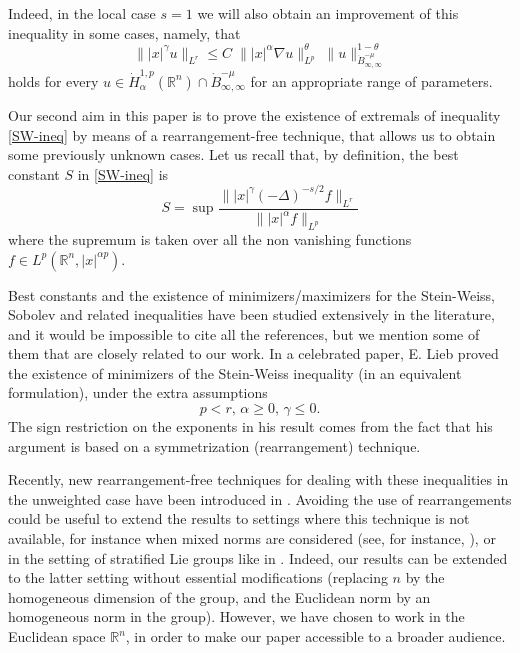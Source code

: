 \documentclass[12pt]{amsart}
\newcommand {\R}{\mathbb{R}}
\newcommand {\be}{\begin{equation}}
\newcommand {\ee}{\end{equation}}
\begin{document}
Indeed, in the local case $s=1$ we will also obtain an improvement of this inequality in some cases, namely, that
\be \| |x|^\gamma u \|_{L^r} \leq 
C \; \| |x|^{\alpha} \nabla u  \|_{L^p}^\theta \;  \| u \|_{\dot{B}^{-\mu}_{\infty,\infty}}^{1-\theta}
\label{nuestra-desigualdad-local}
\ee
holds for  every $u\in  \dot{H}^{1,p}_\alpha(\R^n) \cap 
\dot{B}^{-\mu}_{\infty,\infty} $ for an appropriate range of parameters.

\medskip

Our second aim in this paper is to prove the existence of extremals of inequality \eqref{SW-ineq} by means of a rearrangement-free technique, that allows us to obtain some previously unknown cases.  Let us recall that, by definition, the best constant $S$ in \eqref{SW-ineq} is
\begin{equation} \label{maxim2}
	S=\sup \frac{ \| |x|^\gamma   (-\Delta)^{-s/2} f \|_{L^r}  }{ \| |x|^\alpha f \|_{L^p} }
\end{equation}
where the supremum is taken over all the non vanishing functions $f \in L^p(\R^n, |x|^{\alpha
p})$. 

Best constants and the existence of minimizers/maximizers for
the Stein-Weiss, Sobolev and related inequalities have been studied
extensively in the literature, and it would be impossible to cite all the
references, but we mention some of them that are closely related to our work. 
In a celebrated paper,  E. Lieb  proved  \cite[Theorem 5.1]{Lieb} the existence of minimizers of
the Stein-Weiss inequality (in an equivalent formulation), under the
extra assumptions
$$ p<r,\, \alpha \geq 0, \,\gamma \leq 0. $$
The sign restriction on the exponents in his result comes from the fact that his 
argument is based on a symmetrization (rearrangement) technique.

\medskip

Recently, new rearrangement-free techniques for dealing with these
inequalities in the unweighted case have been introduced in \cite{Frank-Lieb, Frank-Lieb2, PP}. Avoiding
the use of rearrangements could be useful to extend the results to
settings where this technique is not available, for instance when mixed norms are considered (see, for instance, \cite{DL}), or in the setting of stratified Lie groups like in \cite{Ch, Frank-Lieb2}. Indeed,  our results can be extended to the latter setting without essential modifications (replacing $n$ by the
homogeneous dimension of the group, and the Euclidean norm by an homogeneous
norm in the group). However, we have chosen to work in the Euclidean space 
$\R^n$, in order to make our paper accessible to a broader audience. 
\end{document}
